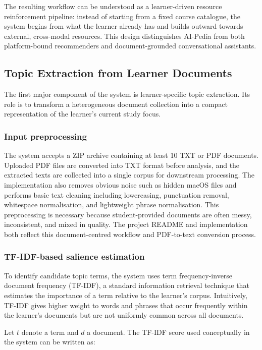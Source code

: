 \documentclass[10pt,journal,compsoc]{IEEEtran}
\begin{document}
The resulting workflow can be understood as a learner-driven resource reinforcement pipeline: instead of starting from a fixed course catalogue, the system begins from what the learner already has and builds outward towards external, cross-modal resources. This design distinguishes AI-Pedia from both platform-bound recommenders and document-grounded conversational assistants.

\subsection{Topic Extraction from Learner Documents}

The first major component of the system is learner-specific topic extraction. Its role is to transform a heterogeneous document collection into a compact representation of the learner's current study focus.

\subsubsection{Input preprocessing}

The system accepts a ZIP archive containing at least 10 TXT or PDF documents. Uploaded PDF files are converted into TXT format before analysis, and the extracted texts are collected into a single corpus for downstream processing. The implementation also removes obvious noise such as hidden macOS files and performs basic text cleaning including lowercasing, punctuation removal, whitespace normalisation, and lightweight phrase normalisation. This preprocessing is necessary because student-provided documents are often messy, inconsistent, and mixed in quality. The project README and implementation both reflect this document-centred workflow and PDF-to-text conversion process.

\subsubsection{TF-IDF-based salience estimation}

To identify candidate topic terms, the system uses term frequency-inverse document frequency (TF-IDF), a standard information retrieval technique that estimates the importance of a term relative to the learner's corpus. Intuitively, TF-IDF gives higher weight to words and phrases that occur frequently within the learner's documents but are not uniformly common across all documents.

Let $t$ denote a term and $d$ a document. The TF-IDF score used conceptually in the system can be written as:
\end{document}
